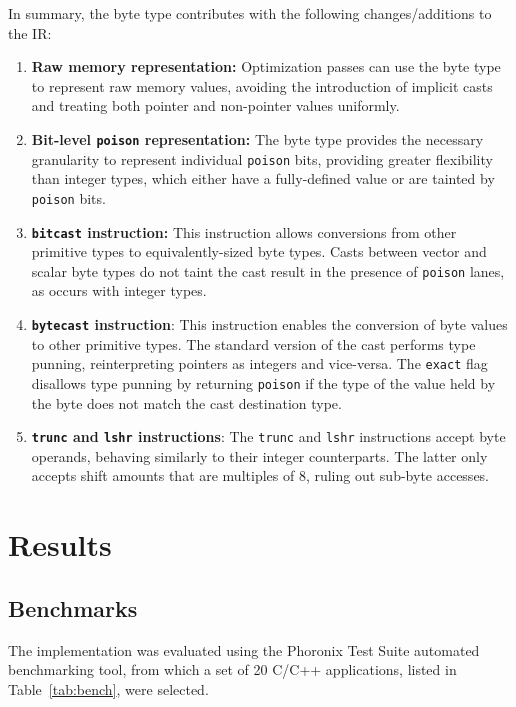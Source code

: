 \documentclass[a4paper,12pt]{article}
\begin{document}
In summary, the byte type contributes with the following changes/additions to the IR:

\begin{enumerate}
  \item
  \textbf{Raw memory representation:}
  Optimization passes can use the byte type to represent raw memory values, avoiding the introduction of implicit casts and treating both pointer and non-pointer values uniformly.

  \item
  \textbf{Bit-level \texttt{poison} representation:}
  The byte type provides the necessary granularity to represent individual \texttt{poison} bits, providing greater flexibility than integer types, which either have a fully-defined value or are tainted by \texttt{poison} bits.

  \item
  \textbf{\texttt{bitcast} instruction:}
  This instruction allows conversions from other primitive types to equivalently-sized byte types. Casts between vector and scalar byte types do not taint the cast result in the presence of \texttt{poison} lanes, as occurs with integer types.

  \item
  \textbf{\texttt{bytecast} instruction}:
  This instruction enables the conversion of byte values to other primitive types.
  The standard version of the cast performs type punning, reinterpreting pointers as integers and vice-versa.
  The \texttt{exact} flag disallows type punning by returning \texttt{poison} if the type of the value held by the byte does not match the cast destination type.

  \item
  \textbf{\texttt{trunc} and \texttt{lshr} instructions}:
  The \texttt{trunc} and \texttt{lshr} instructions accept byte operands, behaving similarly to their integer counterparts.
  The latter only accepts shift amounts that are multiples of 8, ruling out sub-byte accesses.
\end{enumerate}

\section{Results}

\subsection{Benchmarks}

The implementation was evaluated using the Phoronix Test Suite automated benchmarking tool, from which a set of 20 C/C++ applications, listed in Table~\ref{tab:bench}, were selected.
\end{document}
